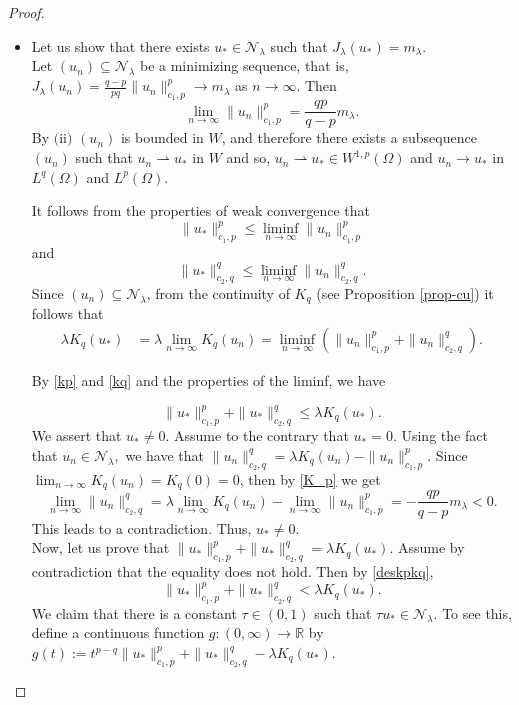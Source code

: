 \documentclass[pdflatex,sn-mathphys-num]{sn-jnl}
\theoremstyle{thmstyleone}%
\theoremstyle{thmstyletwo}%
\theoremstyle{thmstylethree}%
\theoremstyle{thmstylethree}%
\begin{document}
\begin{proof}
\begin{itemize}
\item[(iv)] Let us show that there exists $u_{*} \in \mathcal{N}_{\lambda}$ such that $J_{\lambda}\left(u_{*}\right)=m_{\lambda}$.\\
Let $\left(u_{n}\right) \subseteq \mathcal{N}_{\lambda}$ be a minimizing sequence, that is, $J_{\lambda}\left(u_{n}\right)=\frac{q-p}{pq}\|u_n \|_{c_1,p}^p \rightarrow m_{\lambda}$ as $n\to \infty$. Then \begin{equation}\label{K_p}
    \lim_{n\to\infty}\|u_n \|_{c_1,p}^p=\frac{qp}{q-p}m_{\lambda}.
\end{equation}
By $\mbox{(ii)}$ $\left(u_{n}\right)$ is bounded in $W$,  and therefore there exists a subsequence $\left(u_{n}\right)$ such that $u_{n} \rightharpoonup u_{*} \mbox{ in } W$ and so, $u_{n} \rightharpoonup u_{*} \in W^{1,p}(\Omega)$ and $u_{n} \to u_{*}$ in $L^{q}(\Omega)$ and $L^{p}( \Omega)$.

It follows from the properties of weak convergence  that
\begin{equation}\label{kp}
    \|u_* \|_{c_1,p}^p \leqslant \liminf_{n\to \infty} \|u_n \|_{c_1,p}^p
\end{equation}
and 
\begin{equation}\label{kq}
    \|u_*\|_{c_2,q}^q\leqslant \liminf_{n\to \infty} \|u_n \|_{c_2,q}^q.
\end{equation}
Since $(u_n)\subseteq \mathcal{N}_{\lambda}$, from the continuity of $K_q$ (see Proposition \ref{prop-cu}) it follows that 
\begin{align*}
    \lambda K_q(u_{*})&= \lambda \lim_{n\to\infty} K_q(u_n)=  \liminf_{n\to \infty}( \|u_n \|_{c_1,p}^p+\|u_n \|_{c_2,q}^q).
    \end{align*}

By \eqref{kp} and \eqref{kq} and the properties of the liminf, we have 

\begin{equation}\label{deskpkq}
    \|u_*\|_{c_1,p}^p+\|u_* \|_{c_2,q}^q\leqslant  \lambda K_q(u_{*}) .
\end{equation}
We assert that $u_{*}\neq 0.$ Assume to the contrary that $u_{*}= 0.$
Using the fact that $u_n\in \mathcal{N}_{\lambda},$ we have that $\|u_n \|_{c_2,q}^q=\lambda K_q(u_n)-\|u_n \|_{c_1,p}^p.$ Since $\lim_{n\to\infty}K_q(u_n)=K_q(0)=0$, then by  \eqref{K_p} we get \[\lim_{n\to\infty} \|u_n \|_{c_2,q}^q=\lambda\lim_{n\to\infty} K_q(u_n)-\lim_{n\to\infty} \|u_n \|_{c_1,p}^p=-\frac{qp}{q-p}m_{\lambda}<0.\]
This leads to a contradiction. Thus, $u_{*}\neq 0.$\\
Now, let us prove that  $\|u_*\|_{c_1,p}^p+\|u_* \|_{c_2,q}^q=\lambda K_q(u_{*})$. Assume by contradiction that the equality does not hold. Then by \eqref{deskpkq}, 
\begin{equation}\label{hpc}
\|u_*\|_{c_1,p}^p+\|u_* \|_{c_2,q}^q<\lambda K_q(u_{*}).
\end{equation}
We claim that there is a constant $\tau \in(0,1)$ such that $\tau u_{*} \in \mathcal{N}_{\lambda}$. To see this,  define a continuous function $g:(0, \infty) \rightarrow \mathbb{R}$ by
$
 g(t):=t^{p-q}\|u_*\|_{c_1,p}^p+\|u_* \|_{c_2,q}^q-\lambda K_q(u_{*}).
$


\end{itemize}
\end{proof}
\end{document}
